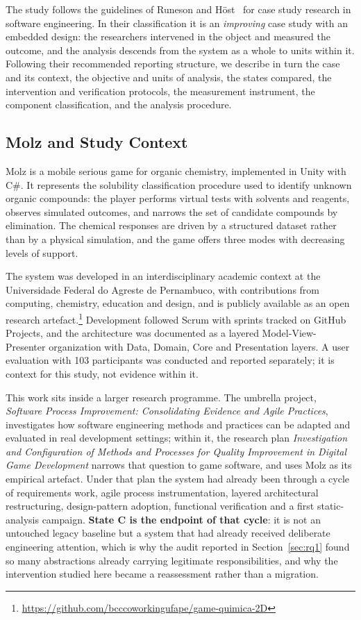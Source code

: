 \documentclass{sbc2019}%
\begin{document}
The study follows the guidelines of Runeson and H\"ost~\cite{runeson2009} for
case study research in software engineering. In their classification it is an
\emph{improving} case study with an embedded design: the researchers intervened
in the object and measured the outcome, and the analysis descends from the system
as a whole to units within it. Following their recommended reporting structure,
we describe in turn the case and its context, the objective and units of analysis,
the states compared, the intervention and verification protocols, the measurement
instrument, the component classification, and the analysis procedure.

\subsection{Molz and Study Context}

Molz is a mobile serious game for organic chemistry, implemented in Unity with
C\#. It represents the solubility classification procedure used to identify
unknown organic compounds: the player performs virtual tests with solvents and
reagents, observes simulated outcomes, and narrows the set of candidate
compounds by elimination. The chemical responses are driven by a structured
dataset rather than by a physical simulation, and the game offers three modes
with decreasing levels of support.

The system was developed in an interdisciplinary academic context at the
Universidade Federal do Agreste de Pernambuco, with contributions from
computing, chemistry, education and design, and is publicly available as an
open research artefact.\footnote{\url{https://github.com/bcccoworkingufape/game-quimica-2D}}
Development followed Scrum with sprints tracked on GitHub Projects, and the
architecture was documented as a layered Model-View-Presenter organization with
Data, Domain, Core and Presentation layers. A user evaluation with 103
participants was conducted and reported separately; it is context for this
study, not evidence within it.

This work sits inside a larger research programme. The umbrella project,
\emph{Software Process Improvement: Consolidating Evidence and Agile
Practices}, investigates how software engineering methods and practices can be
adapted and evaluated in real development settings; within it, the research
plan \emph{Investigation and Configuration of Methods and Processes for Quality
Improvement in Digital Game Development} narrows that question to game
software, and uses Molz as its empirical artefact. Under that plan the system
had already been through a cycle of requirements work, agile process
instrumentation, layered architectural restructuring, design-pattern adoption,
functional verification and a first static-analysis campaign. \textbf{State C is
the endpoint of that cycle}: it is not an untouched legacy baseline but a system
that had already received deliberate engineering attention, which is why the
audit reported in Section~\ref{sec:rq1} found so many abstractions already
carrying legitimate responsibilities, and why the intervention studied here
became a reassessment rather than a migration.
\end{document}
